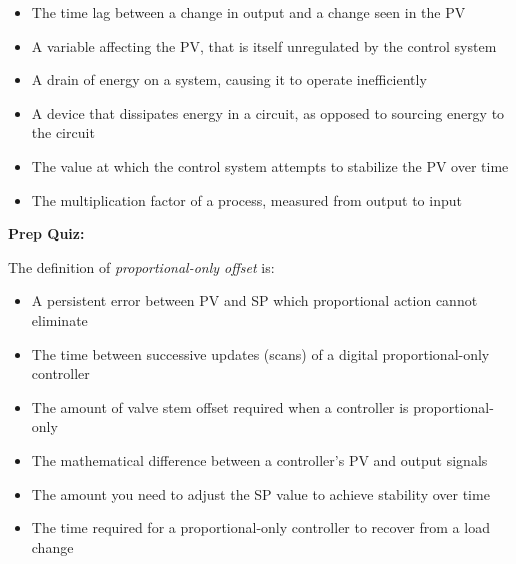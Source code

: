 \begin{itemize}
\item{} The time lag between a change in output and a change seen in the PV
\vskip 5pt 
\item{} A variable affecting the PV, that is itself unregulated by the control system
\vskip 5pt 
\item{} A drain of energy on a system, causing it to operate inefficiently
\vskip 5pt 
\item{} A device that dissipates energy in a circuit, as opposed to sourcing energy to the circuit
\vskip 5pt 
\item{} The value at which the control system attempts to stabilize the PV over time
\vskip 5pt 
\item{} The multiplication factor of a process, measured from output to input
\end{itemize}








\vfil \eject

\noindent
{\bf Prep Quiz:}

The definition of {\it proportional-only offset} is:

\begin{itemize}
\item{} A persistent error between PV and SP which proportional action cannot eliminate
\vskip 5pt 
\item{} The time between successive updates (scans) of a digital proportional-only controller
\vskip 5pt 
\item{} The amount of valve stem offset required when a controller is proportional-only
\vskip 5pt 
\item{} The mathematical difference between a controller's PV and output signals
\vskip 5pt 
\item{} The amount you need to adjust the SP value to achieve stability over time
\vskip 5pt 
\item{} The time required for a proportional-only controller to recover from a load change
\end{itemize}





